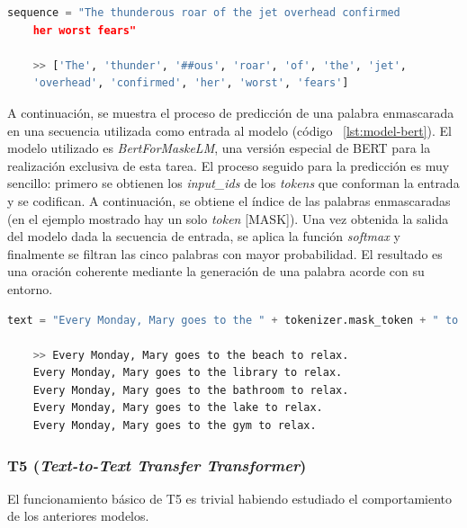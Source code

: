 \begin{lstlisting}[language=Python, caption=Resultado de aplicar \textit{BertTokenizer} a un texto de entrada, label={lst:tokenizer-bert}]
	sequence = "The thunderous roar of the jet overhead confirmed 
	her worst fears"
	
	>> ['The', 'thunder', '##ous', 'roar', 'of', 'the', 'jet', 
	'overhead', 'confirmed', 'her', 'worst', 'fears']
\end{lstlisting} 

A continuación, se muestra el proceso de predicción de una palabra enmascarada en una secuencia utilizada como entrada al modelo (código ~\ref{lst:model-bert}). El modelo utilizado es \textit{BertForMaskeLM}, una versión especial de BERT para la realización exclusiva de esta tarea. El proceso seguido para la predicción es muy sencillo: primero se obtienen los \textit{input\_ids} de los \textit{tokens} que conforman la entrada y se codifican. A continuación, se obtiene el índice de las palabras enmascaradas (en el ejemplo mostrado hay un solo \textit{token} [MASK]). Una vez obtenida la salida del modelo dada la secuencia de entrada, se aplica la función \textit{softmax} y finalmente se filtran las cinco palabras con mayor probabilidad. El resultado es una oración coherente mediante la generación de una palabra acorde con su entorno.

\begin{lstlisting}[language=Python, caption=Ejemplo de predicción de una palabra enmascarada en una secuencia, label={lst:model-bert}]
	text = "Every Monday, Mary goes to the " + tokenizer.mask_token + " to relax."
	
	>> Every Monday, Mary goes to the beach to relax.
	Every Monday, Mary goes to the library to relax.
	Every Monday, Mary goes to the bathroom to relax.
	Every Monday, Mary goes to the lake to relax.
	Every Monday, Mary goes to the gym to relax.
\end{lstlisting} 


\subsubsection{T5 (\textit{Text-to-Text Transfer Transformer})}


El funcionamiento básico de T5 es trivial habiendo estudiado el comportamiento de los anteriores modelos. 

